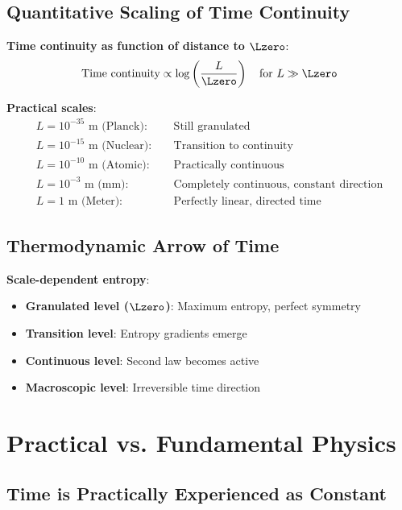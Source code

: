 	\subsection{Quantitative Scaling of Time Continuity}
	
	\textbf{Time continuity as function of distance to $\Lzero$}:
	\begin{equation}
		\text{Time continuity} \propto \log\left(\frac{L}{\Lzero}\right) \quad \text{for } L \gg \Lzero
	\end{equation}
	
	\textbf{Practical scales}:
	\begin{align}
		L = 10^{-35}\text{ m (Planck)}: &\quad \text{Still granulated} \\
		L = 10^{-15}\text{ m (Nuclear)}: &\quad \text{Transition to continuity} \\
		L = 10^{-10}\text{ m (Atomic)}: &\quad \text{Practically continuous} \\
		L = 10^{-3}\text{ m (mm)}: &\quad \text{Completely continuous, constant direction} \\
		L = 1\text{ m (Meter)}: &\quad \text{Perfectly linear, directed time}
	\end{align}
	
	\subsection{Thermodynamic Arrow of Time}
	
	\textbf{Scale-dependent entropy}:
	\begin{itemize}
		\item \textbf{Granulated level ($\Lzero$)}: Maximum entropy, perfect symmetry
		\item \textbf{Transition level}: Entropy gradients emerge
		\item \textbf{Continuous level}: Second law becomes active
		\item \textbf{Macroscopic level}: Irreversible time direction
	\end{itemize}
	
	\section{Practical vs. Fundamental Physics}
	
	\subsection{Time is Practically Experienced as Constant}
	

